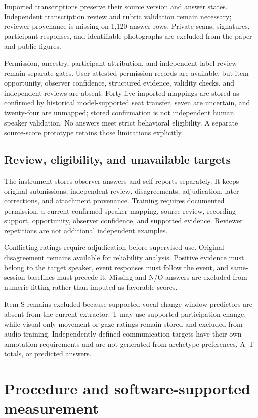 \documentclass{article}
\begin{document}
Imported transcriptions preserve their source version and answer states. Independent transcription review and rubric validation remain necessary; reviewer provenance is missing on 1,120 answer rows. Private scans, signatures, participant responses, and identifiable photographs are excluded from the paper and public figures.

Permission, ancestry, participant attribution, and independent label review remain separate gates. User-attested permission records are available, but item opportunity, observer confidence, structured evidence, validity checks, and independent reviews are absent. Forty-five imported mappings are stored as confirmed by historical model-supported seat transfer, seven are uncertain, and twenty-four are unmapped; stored confirmation is not independent human speaker validation. No answers meet strict behavioral eligibility. A separate source-score prototype retains those limitations explicitly.

\subsection{Review, eligibility, and unavailable targets}
The instrument stores observer answers and self-reports separately. It keeps original submissions, independent review, disagreements, adjudication, later corrections, and attachment provenance. Training requires documented permission, a current confirmed speaker mapping, source review, recording support, opportunity, observer confidence, and supported evidence. Reviewer repetitions are not additional independent examples.

Conflicting ratings require adjudication before supervised use. Original disagreement remains available for reliability analysis. Positive evidence must belong to the target speaker, event responses must follow the event, and same-session baselines must precede it. Missing and N/O answers are excluded from numeric fitting rather than imputed as favorable scores.

Item S remains excluded because supported vocal-change window predictors are absent from the current extractor. T may use supported participation change, while visual-only movement or gaze ratings remain stored and excluded from audio training. Independently defined communication targets have their own annotation requirements and are not generated from archetype preferences, A--T totals, or predicted answers.

\section{Procedure and software-supported measurement}
\end{document}
